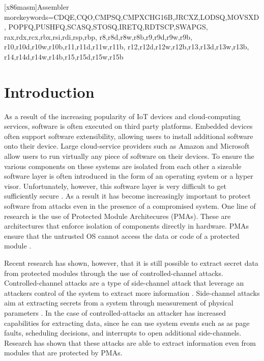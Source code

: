 
   [x86masm]{Assembler} %
   {morekeywords={CDQE,CQO,CMPSQ,CMPXCHG16B,JRCXZ,LODSQ,MOVSXD, %
                  POPFQ,PUSHFQ,SCASQ,STOSQ,IRETQ,RDTSCP,SWAPGS, %
                  rax,rdx,rcx,rbx,rsi,rdi,rsp,rbp, %
                  r8,r8d,r8w,r8b,r9,r9d,r9w,r9b, %
                  r10,r10d,r10w,r10b,r11,r11d,r11w,r11b, %
                  r12,r12d,r12w,r12b,r13,r13d,r13w,r13b, %
                  r14,r14d,r14w,r14b,r15,r15d,r15w,r15b}} %


\chapter{Introduction}
\label{cha:introduction}
As a result of the increasing popularity of IoT devices and cloud-computing services, software is often executed on third party platforms. 
Embedded devices often support software extensibility, allowing users to install additional software onto their device. 
Large cloud-service providers such as Amazon and Microsoft allow users to run virtually any piece of software on their devices. 
To ensure the various components on these systems are isolated from each other a sizeable software layer is often introduced in the form of an operating system or 
a hyper visor.
Unfortunately, however, this software layer is very difficult to get sufficiently secure \cite{psma}.
As a result it has become increasingly important to protect software from attacks even in the presence of a compromised system. 
One line of research is the use of Protected Module Architecures (PMAs). 
These are architectures that enforce isolation of components directly in hardware.
PMAs ensure that the untrusted OS cannot access the data or code of a protected module \cite{Nemesis}. 

Recent research has shown, however, that it is still possible to extract secret data from protected modules through the use of controlled-channel attacks. 
Controlled-channel attacks are a type of side-channel attack that leverage an attackers control of the system to extract more information \cite{Xu}.	
Side-channel attacks aim at extracting secrets from a system through measurement of physical parameters \cite{side-channel}. 
In the case of controlled-attacks an attacker has increased capabilities for extracting data, since he can use system events such as as page faults, scheduling decisions, and interrupts to open additional side-channels. 
Research has shown that these attacks are able to extract information even from modules that are protected by PMAs. 

